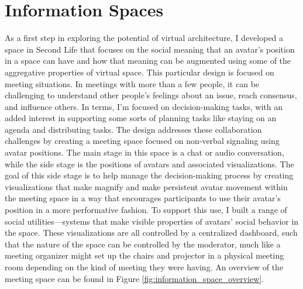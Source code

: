 
%
%



\section{Information Spaces}
As a first step in exploring the potential of virtual architecture, I developed a space in Second Life that focuses on the social meaning that an avatar's position in a space can have and how that meaning can be augmented using some of the aggregative properties of virtual space. \citep{Harry:2008ww} This particular design is focused on meeting situations. In meetings with more than a few people, it can be challenging to understand other people's feelings about an issue, reach consensus, and influence others. In  terms, I'm focused on decision-making tasks, with an added interest in supporting some sorts of planning tasks like staying on an agenda and distributing tasks. The design addresses these collaboration challenges by creating a meeting space focused on non-verbal signaling using avatar positions. The main stage in this space is a chat or audio conversation, while the side stage is the positions of avatars and associated visualizations. The goal of this side stage is to help manage the decision-making process by creating visualizations that make magnify and make persistent avatar movement within the meeting space in a way that encourages participants to use their avatar's position in a more performative fashion. To support this use, I built a range of social utilities---systems that make visible properties of avatars' social behavior in the space. These visualizations are all controlled by a centralized dashboard, such that the nature of the space can be controlled by the moderator, much like a meeting organizer might set up the chairs and projector in a physical meeting room depending on the kind of meeting they were having. An overview of the meeting space can be found in  Figure \ref{fig:information_space_overview}.

